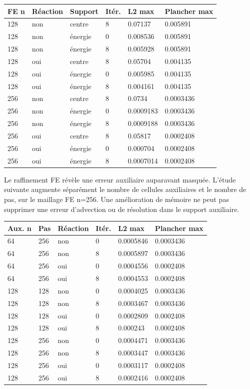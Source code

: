 \documentclass[10pt,a4paper]{article}
\begin{document}
\begin{center}\small\begin{tabular}{llllll}\toprule
FE n & Réaction & Support & Itér. & L2 max & Plancher max\\\midrule
128 & non & centre & 8 & 0.07137 & 0.005891\\
128 & non & énergie & 0 & 0.008536 & 0.005891\\
128 & non & énergie & 8 & 0.005928 & 0.005891\\
128 & oui & centre & 8 & 0.05704 & 0.004135\\
128 & oui & énergie & 0 & 0.005985 & 0.004135\\
128 & oui & énergie & 8 & 0.004161 & 0.004135\\
256 & non & centre & 8 & 0.0734 & 0.0003436\\
256 & non & énergie & 0 & 0.0009183 & 0.0003436\\
256 & non & énergie & 8 & 0.0009188 & 0.0003436\\
256 & oui & centre & 8 & 0.05817 & 0.0002408\\
256 & oui & énergie & 0 & 0.000704 & 0.0002408\\
256 & oui & énergie & 8 & 0.0007014 & 0.0002408\\
\bottomrule\end{tabular}\end{center}
Le raffinement FE révèle une erreur auxiliaire auparavant masquée. L'étude suivante augmente séparément le nombre de cellules auxiliaires et le nombre de pas, sur le maillage FE n=256. Une amélioration de mémoire ne peut pas supprimer une erreur d'advection ou de résolution dans le support auxiliaire.

\begin{center}\small\begin{tabular}{llllll}\toprule
Aux. n & Pas & Réaction & Itér. & L2 max & Plancher max\\\midrule
64 & 256 & non & 0 & 0.0005846 & 0.0003436\\
64 & 256 & non & 8 & 0.0005897 & 0.0003436\\
64 & 256 & oui & 0 & 0.0004556 & 0.0002408\\
64 & 256 & oui & 8 & 0.0004553 & 0.0002408\\
128 & 128 & non & 0 & 0.0004025 & 0.0003436\\
128 & 128 & non & 8 & 0.0003467 & 0.0003436\\
128 & 128 & oui & 0 & 0.0002809 & 0.0002408\\
128 & 128 & oui & 8 & 0.000243 & 0.0002408\\
128 & 256 & non & 0 & 0.0004471 & 0.0003436\\
128 & 256 & non & 8 & 0.0003447 & 0.0003436\\
128 & 256 & oui & 0 & 0.0003117 & 0.0002408\\
128 & 256 & oui & 8 & 0.0002416 & 0.0002408\\
\bottomrule\end{tabular}\end{center}
\end{document}
